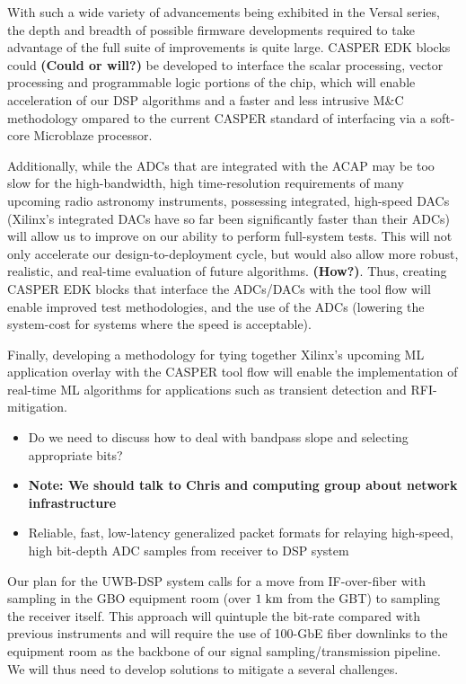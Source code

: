 \documentclass[10pt]{myNSF}
\begin{document}
With such a wide variety of advancements being exhibited in the Versal
series, the depth and breadth of possible firmware developments
required to take advantage of the full suite of improvements is quite
large. CASPER EDK blocks could \textbf{(Could or will?)} be developed
to interface the scalar processing, vector processing and programmable
logic portions of the chip, which will enable acceleration of our DSP
algorithms and a faster and less intrusive M\&C methodology ompared to
the current CASPER standard of interfacing via a soft-core Microblaze
processor.

Additionally, while the ADCs that are integrated with the ACAP may be
too slow for the high-bandwidth, high time-resolution requirements of
many upcoming radio astronomy instruments, possessing integrated,
high-speed DACs (Xilinx’s integrated DACs have so far been
significantly faster than their ADCs) will allow us to improve on our
ability to perform full-system tests.  This will not only accelerate
our design-to-deployment cycle, but would also allow more robust,
realistic, and real-time evaluation of future algorithms.
\textbf{(How?)}.  Thus, creating CASPER EDK blocks that interface the
ADCs/DACs with the tool flow will enable improved test methodologies,
and the use of the ADCs (lowering the system-cost for systems where
the speed is acceptable).

Finally, developing a methodology for tying together Xilinx’s upcoming
ML application overlay with the CASPER tool flow will enable the
implementation of real-time ML algorithms for applications such as
transient detection and RFI-mitigation.

\begin{itemize}
\item{Do we need to discuss how to deal with bandpass slope and
    selecting appropriate bits?}
\end{itemize}


\begin{itemize}
\item{\textbf{Note: We should talk to Chris and computing group
      about network infrastructure}}
\item{Reliable, fast, low-latency generalized packet formats for
    relaying high-speed, high bit-depth ADC samples from receiver to
    DSP system}
\end{itemize}

Our plan for the UWB-DSP system calls for a move from IF-over-fiber
with sampling in the GBO equipment room (over $1\; \textrm{km}$ from the GBT)
to sampling the receiver itself.  This approach will quintuple the
bit-rate compared with previous instruments and will require the use
of 100-GbE fiber downlinks to the equipment room as the backbone of
our signal sampling/transmission pipeline.  We will thus need to
develop solutions to mitigate a several challenges.
\end{document}
